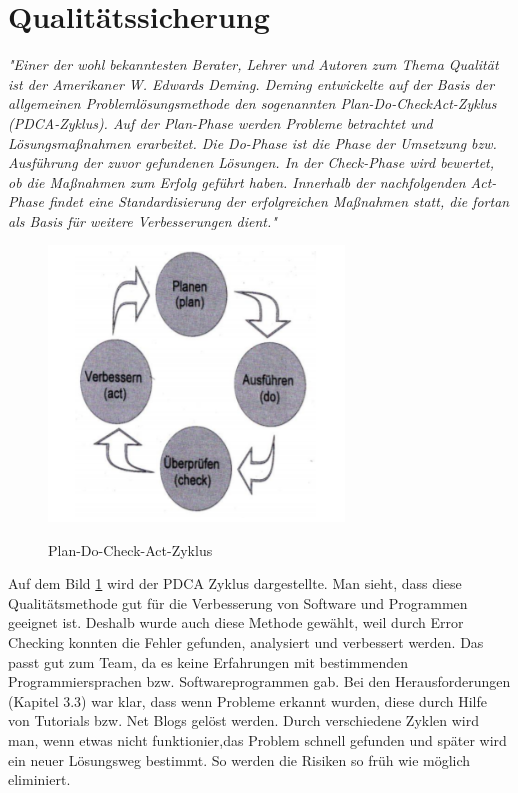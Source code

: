 \section{Qualitätssicherung}
\textit{"Einer der wohl bekanntesten Berater, Lehrer und Autoren zum Thema Qualität ist der Amerikaner W. Edwards Deming. Deming
entwickelte auf der Basis der allgemeinen Problemlösungsmethode den sogenannten Plan-Do-CheckAct-Zyklus (PDCA-Zyklus). Auf der Plan-Phase werden Probleme betrachtet und Lösungsmaßnahmen
erarbeitet. Die Do-Phase ist die Phase der Umsetzung bzw. Ausführung der zuvor gefundenen
Lösungen. In der Check-Phase wird bewertet, ob die Maßnahmen zum Erfolg geführt haben.
Innerhalb der nachfolgenden Act-Phase findet eine Standardisierung der erfolgreichen Maßnahmen
statt, die fortan als Basis für weitere Verbesserungen dient."}\cite{PDCA-Zyklus}
\bigbreak 
\begin{figure}[!htb]
  \centering
    \includegraphics[width=0.7\textwidth]{./figures/pdca.png}
      \caption{Plan-Do-Check-Act-Zyklus}
    \label{fig:pdca}
	\cite{PDCA-Zyklus}
\end{figure}
Auf dem Bild \ref{fig:pdca} wird der PDCA Zyklus dargestellte. Man sieht, dass diese Qualitätsmethode gut für die Verbesserung von Software und Programmen geeignet ist. Deshalb wurde auch diese Methode gewählt, weil durch Error Checking konnten die Fehler gefunden, analysiert und verbessert werden. Das passt gut zum Team, da es keine Erfahrungen mit bestimmenden Programmiersprachen bzw. Softwareprogrammen gab.
\bigbreak
Bei den Herausforderungen (Kapitel 3.3) war klar, dass wenn Probleme erkannt wurden, diese durch Hilfe von Tutorials bzw. Net Blogs gelöst werden. Durch verschiedene Zyklen wird man, wenn etwas nicht funktionier,das Problem  schnell gefunden und später wird ein neuer Lösungsweg bestimmt. So werden die Risiken so früh wie möglich eliminiert.

